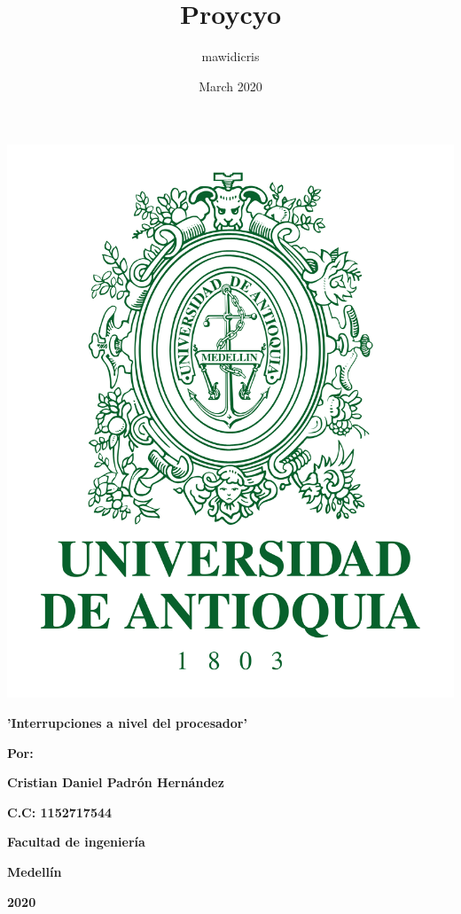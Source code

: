 \documentclass{article}
\title{Proycyo}
\author{mawidicris }
\date{March 2020}
\begin{document}
\begin{center}
\includegraphics[scale=0.090]{Escudo-UdeA.svg.png}
\end{center}
\vspace{50pt}
\begin{center}
\bf{\sc\Large 'Interrupciones a nivel del procesador'}\\
\end{center}
\vspace{50pt}
\begin{center}
\begin{center}
\bf{\sc\large Por:}\\
\end{center}
\bf{\sc\large Cristian Daniel Padrón Hernández}\\
\end{center}
\begin{center}

\bf{\sc\large C.C: 1152717544}\\
\end{center}
\vspace{50pt}
\begin{center}
\bf{\sc\large Facultad de ingeniería}\\
\end{center}
\begin{center}
\bf{\sc\large Medellín}
\end{center}
\begin{center}
\bf{\sc\large 2020}\\
\end{center}\
\end{document}
